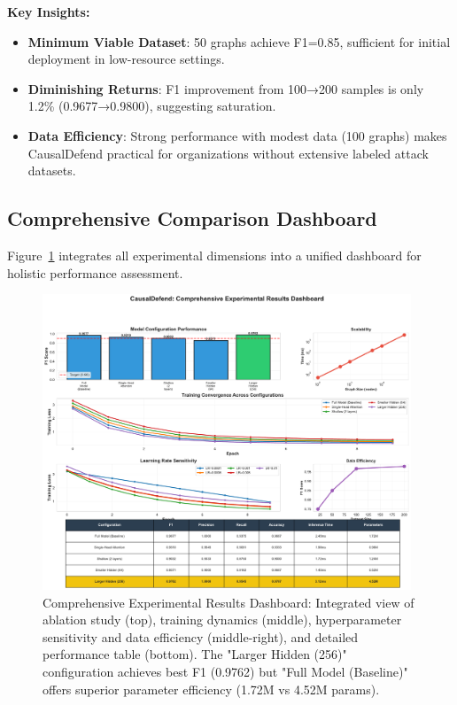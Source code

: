 \documentclass[conference]{IEEEtran}
\begin{document}
\textbf{Key Insights:}
\begin{itemize}
    \item \textbf{Minimum Viable Dataset}: 50 graphs achieve F1=0.85, sufficient for initial deployment in low-resource settings.
    
    \item \textbf{Diminishing Returns}: F1 improvement from 100→200 samples is only 1.2\% (0.9677→0.9800), suggesting saturation.
    
    \item \textbf{Data Efficiency}: Strong performance with modest data (100 graphs) makes CausalDefend practical for organizations without extensive labeled attack datasets.
\end{itemize}

\subsection{Comprehensive Comparison Dashboard}

Figure~\ref{fig:dashboard} integrates all experimental dimensions into a unified dashboard for holistic performance assessment.

\begin{figure}[!t]
\centering
\includegraphics[width=0.98\textwidth]{experiments/results/comprehensive_dashboard.pdf}
\caption{Comprehensive Experimental Results Dashboard: Integrated view of ablation study (top), training dynamics (middle), hyperparameter sensitivity and data efficiency (middle-right), and detailed performance table (bottom). The "Larger Hidden (256)" configuration achieves best F1 (0.9762) but "Full Model (Baseline)" offers superior parameter efficiency (1.72M vs 4.52M params).}
\label{fig:dashboard}
\end{figure}
\end{document}

